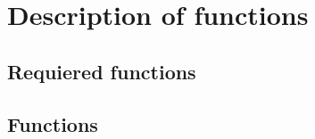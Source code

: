 \chapter{Description of functions}\label{Functions}
\section{Requiered functions}
\section{Functions}

